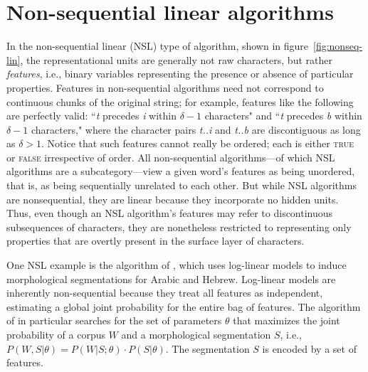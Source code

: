 \section{Non-sequential linear algorithms}
\label{subsec:nonseq-lin}
In the non-sequential linear (NSL) type of algorithm, shown in figure~\ref{fig:nonseq-lin}, the representational units are generally not raw characters, but rather \emph{features}, i.e., binary variables representing the presence or absence of particular properties.
Features in non-sequential algorithms need not correspond to continuous chunks of the original string; for example, features like the following are perfectly valid: ``\textit{t} precedes \textit{i} within $\delta-1$ characters" and ``\textit{t} precedes \textit{b} within $\delta-1$ characters," where the character pairs \emph{t..i} and \emph{t..b} are discontiguous as long as $\delta > 1$. Notice that such features cannot really be ordered; each is either \textsc{true} or \textsc{false} irrespective of order.
All non-sequential algorithms---of which NSL algorithms are a subcategory---view a given word's features as being unordered, that is, as being sequentially unrelated to each other. 
But while NSL algorithms are nonsequential, they are linear because they incorporate no hidden units. Thus, even though an NSL algorithm's features may refer to discontinuous subsequences of characters, they are nonetheless restricted to representing only properties that are overtly present in the surface layer of characters. 

One NSL example is the algorithm of \cite{poon-et-al:2009}, which uses log-linear models to induce morphological segmentations for Arabic and Hebrew. 
Log-linear models are inherently non-sequential because they treat all features as independent, estimating a global joint probability for the entire bag of features. 
The algorithm of \cite{poon-et-al:2009} in particular searches for the set of parameters $\theta$ that maximizes the joint probability of a corpus $W$ and a morphological segmentation $S$, i.e., $P(W,S| \theta) = P(W|S; \theta) \cdot P(S| \theta)$. The segmentation $S$ is encoded by a set of features.

